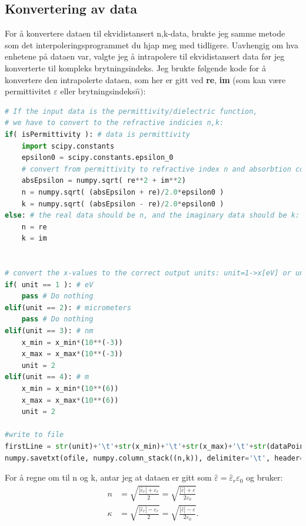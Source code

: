 \subsection{Konvertering av data}
For å konvertere dataen til ekvidistansert n,k-data, brukte jeg samme 
metode som det interpoleringsprogrammet du hjap meg med tidligere. 
Uavhengig om hva enhetene på dataen var, valgte jeg å intrapolere til ekvidistansert
data før jeg konverterte til kompleks brytningsindeks. 
Jeg brukte følgende kode for å konvertere den intrapolerte dataen, som 
her er gitt ved \textbf{re}, \textbf{im} (som kan være permittivitet $\varepsilon$ eller 
brytningsindeks$\hat{n})$:
\begin{lstlisting}[style=FormattedNumber, language=python]
# If the input data is the permittivity/dielectric function, 
# we have to convert to the refractive indicies n,k:
if( isPermittivity ): # data is permittivity
    import scipy.constants
    epsilon0 = scipy.constants.epsilon_0
    # convert from permittivity to refractive index n and absorbtion coeff k:
    absEpsilon = numpy.sqrt( re**2 + im**2)
    n = numpy.sqrt( (absEpsilon + re)/2.0*epsilon0 )
    k = numpy.sqrt( (absEpsilon - re)/2.0*epsilon0 )
else: # the real data should be n, and the imaginary data should be k:
    n = re
    k = im


# convert the x-values to the correct output units: unit=1->x[eV] or unit=2->x[micrometers]
if( unit == 1 ): # eV
    pass # Do nothing
elif(unit == 2): # micrometers
    pass # Do nothing
elif(unit == 3): # nm
    x_min = x_min*(10**(-3))
    x_max = x_max*(10**(-3))
    unit = 2
elif(unit == 4): # m
    x_min = x_min*(10**(6))
    x_max = x_max*(10**(6))
    unit = 2

#write to file
firstLine = str(unit)+'\t'+str(x_min)+'\t'+str(x_max)+'\t'+str(dataPoints)  
numpy.savetxt(ofile, numpy.column_stack((n,k)), delimiter='\t', header=firstLine, comments='')
\end{lstlisting}
For å regne om til n og k, antar jeg at dataen er gitt som $\hat\varepsilon = \hat\varepsilon_r \varepsilon_0$
og bruker:
\begin{align}
   n      &= \sqrt{ \frac{|\hat{\varepsilon}_r| + \varepsilon_r}{2}} 
           = \sqrt{ \frac{|\hat{\varepsilon}| + \varepsilon}{2\varepsilon_0}}\\
   \kappa &= \sqrt{ \frac{|\hat{\varepsilon}_r| - \varepsilon_r}{2}} 
           = \sqrt{ \frac{|\hat{\varepsilon}| - \varepsilon}{2\varepsilon_0}}.
\end{align}

